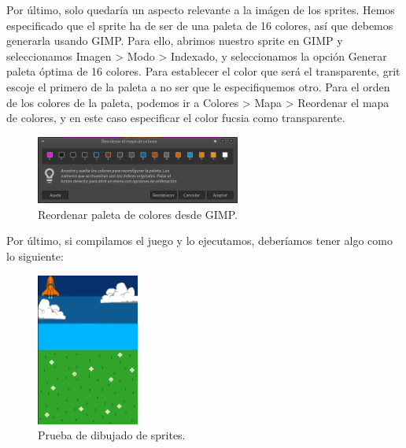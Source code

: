 \vspace{0.5cm}

Por último, solo quedaría un aspecto relevante a la imágen de los sprites. Hemos especificado que el sprite ha de ser de una paleta de 16 colores, así que debemos generarla usando GIMP. Para ello, abrimos nuestro sprite en GIMP y seleccionamos Imagen > Modo > Indexado, y seleccionamos la opción Generar paleta óptima de 16 colores. Para establecer el color que será el transparente, grit escoje el primero de la paleta a no ser que le especifiquemos otro. Para el orden de los colores de la paleta, podemos ir a Colores > Mapa > Reordenar el mapa de colores, y en este caso especificar el color fucsia como transparente.

\vspace{0.5cm}

\begin{figure}[htbp]
\centering
  \includegraphics[width=0.6\textwidth]{archivos/paleta_map.png}
  \caption{Reordenar paleta de colores desde GIMP.}
  \label{fig:paleta_map}
\end{figure}

\vspace{0.5cm}

Por último, si compilamos el juego y lo ejecutamos, deberíamos tener algo como lo siguiente:

\clearpage

\begin{figure}[htbp]
\centering
  \includegraphics[width=0.3\textwidth]{archivos/sprite_prue.png}
  \caption{Prueba de dibujado de sprites.}
  \label{fig:sprite_prue}
\end{figure}

